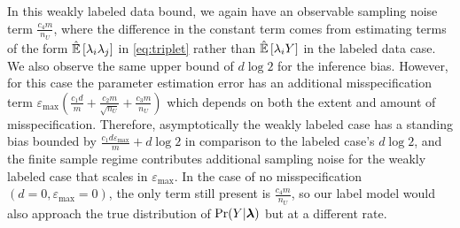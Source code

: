 In this weakly labeled data bound, we again have an observable sampling noise term $\frac{c_4 m}{n_U}$, where the difference in the constant term comes from estimating terms of the form $\hat{\mathbb{E}}\left[\lambda_i \lambda_j\right]$ in \eqref{eq:triplet} rather than $\hat{\mathbb{E}}\left[\lambda_i Y\right]$ in the labeled data case. We also observe the same upper bound of $d \log 2$ for the inference bias. However, for this case the parameter estimation error has an additional misspecification term $\varepsilon_{\max} \left(\frac{c_1 d}{m} + \frac{c_2 m}{\sqrt{n_U}} + \frac{c_3 m}{n_U}\right)$ which depends on both the extent and amount of misspecification. Therefore, asymptotically the weakly labeled case has a standing bias bounded by $\frac{c_1 d \varepsilon_{\max}}{m} + d \log 2$ in comparison to the labeled case's $d \log 2$, and the finite sample regime contributes additional sampling noise for the weakly labeled case that scales in $\varepsilon_{\max}$. In the case of no misspecification $(d = 0, \varepsilon_{\max} = 0)$, the only term still present is $\frac{c_4 m}{n_U}$, so our label model would also approach the true distribution of $\Pr(Y | \bm{\lambda})$ but at a different rate. 




